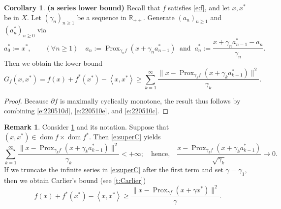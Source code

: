 \documentclass[12pt]{article}
\newcommand{\scal}[2]{\left\langle{#1},{#2}  \right\rangle}
\newcommand{\RPP}{\ensuremath{\mathbb{R}_{++}}}
\newcommand{\dom}{\ensuremath{\operatorname{dom}}}
\newcommand{\prox}{\ensuremath{\operatorname{Prox}}}
\newcommand{\pinf}{\ensuremath{+\infty}}
\theoremstyle{definition}
\newtheorem{corollary}[theorem]{Corollary}
\newtheorem{remark}[theorem]{Remark}
\providecommand{\dom}{\operatorname{dom}}
\begin{document}
{\begin{corollary} {\bf (a series lower bound)} 
\label{c:superC}
Recall that $f$ satisfies \cref{e:f}, and let $x,x^*$ be in $X$. 
Let $(\gamma_n)_{n\geq 1}$ be a sequence in $\RPP$.
Generate $(a_n)_{n\geq 1}$
and $(a_n^*)_{n\geq 0}$ via 
\begin{equation}
\label{e:superseq}
a_0^* := x^*,\qquad 
(\forall n\geq 1)\quad 
a_n := \prox_{\gamma_n f}(x+\gamma_na_{n-1}^*)
\;\;\text{and}\;\;
a_n^* := \frac{x+\gamma_n a_{n-1}^*-a_n }{\gamma_n}. 
\end{equation}
Then we obtain the lower bound
\begin{equation}
\label{e:superC}
G_f(x,x^*)=f(x)+f^*(x^*)-\scal{x}{x^*}
\geq 
\sum_{k=1}^\infty 
\frac{\|x-\prox_{\gamma_kf}(x+\gamma_ka_{k-1}^*)\|^2}{\gamma_k}.
\end{equation}
\end{corollary}
\begin{proof}
Because $\partial f$ is maximally cyclically monotone, 
the result thus follows by combining 
\cref{e:220510d}, \cref{e:220510e}, and \cref{e:220510c}. 
\end{proof}

\begin{remark}
Consider \cref{c:superC} and its notation. 
Suppose that $(x,x^*)\in\dom f\times \dom f^*$.
Then \cref{e:superC} yields 
\begin{equation}
\sum_{k=1}^\infty 
\frac{\|x-\prox_{\gamma_kf}(x+\gamma_ka_{k-1}^*)\|^2}{\gamma_k} < \pinf;
\quad\text{hence,}\quad
\frac{x-\prox_{\gamma_kf}(x+\gamma_ka_{k-1}^*)}{\sqrt{\gamma_k}} \to 0. 
\end{equation}
If we truncate the infinite series in \cref{e:superC} after the first term and 
set $\gamma = \gamma_1$,
then we obtain Carlier's bound  (see \cref{t:Carlier})
\begin{equation}
f(x)+f^*(x^*)-\scal{x}{x^*} 
\geq \frac{\|x-\prox_{\gamma f}(x+\gamma x^*)\|^2}{\gamma}. 
\end{equation}
\end{remark}

}
\end{document}
